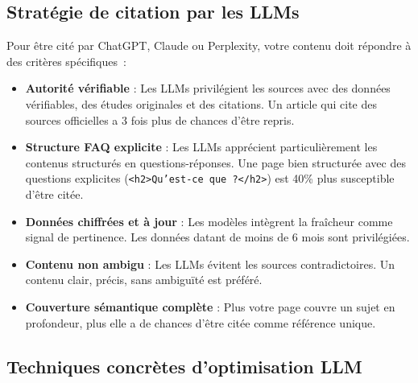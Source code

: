 \documentclass[12pt,a4paper,twoside]{report}
\begin{document}
\subsection{Stratégie de citation par les LLMs}

Pour être cité par ChatGPT, Claude ou Perplexity, votre contenu doit répondre à des critères spécifiques~:

\begin{itemize}
    \item \textbf{Autorité vérifiable} : Les LLMs privilégient les sources avec des données vérifiables, des études originales et des citations. Un article qui cite des sources officielles a 3 fois plus de chances d'être repris.
    \item \textbf{Structure FAQ explicite} : Les LLMs apprécient particulièrement les contenus structurés en questions-réponses. Une page bien structurée avec des questions explicites (\texttt{<h2>Qu'est-ce que~?</h2>}) est 40\% plus susceptible d'être citée.
    \item \textbf{Données chiffrées et à jour} : Les modèles intègrent la fraîcheur comme signal de pertinence. Les données datant de moins de 6 mois sont privilégiées.
    \item \textbf{Contenu non ambigu} : Les LLMs évitent les sources contradictoires. Un contenu clair, précis, sans ambiguïté est préféré.
    \item \textbf{Couverture sémantique complète} : Plus votre page couvre un sujet en profondeur, plus elle a de chances d'être citée comme référence unique.
\end{itemize}

\subsection{Techniques concrètes d'optimisation LLM}
\end{document}
